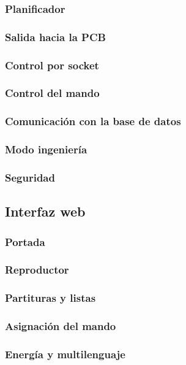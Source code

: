\documentclass[10pt,a4paper]{article}
\begin{document}
	\subsubsection{Planificador}
	\subsubsection{Salida hacia la PCB}
	\subsubsection{Control por socket}
	\subsubsection{Control del mando}
	\subsubsection{Comunicación con la base de datos}
	\subsubsection{Modo ingeniería}
	\subsubsection{Seguridad}
	
	\subsection{Interfaz web}
	
	\subsubsection{Portada}
	\subsubsection{Reproductor}
	\subsubsection{Partituras y listas}
	\subsubsection{Asignación del mando}
	\subsubsection{Energía y multilenguaje}	
	
\end{document}

